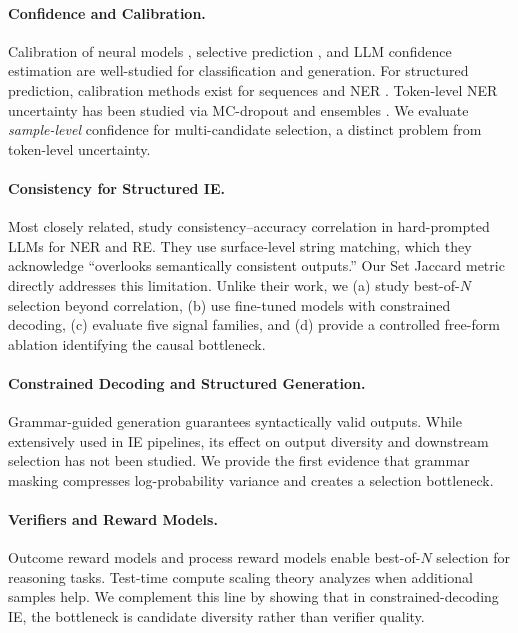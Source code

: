 \documentclass[11pt,a4paper]{article}
\begin{document}
\paragraph{Confidence and Calibration.}
Calibration of neural models \citep{guo2017calibration}, selective prediction \citep{geifman2017selective,abstentionsurvey2025}, and LLM confidence estimation \citep{confestsurvey2024} are well-studied for classification and generation. For structured prediction, calibration methods exist for sequences \citep{kuleshov2015calibration} and NER \citep{jagannatha2022calibrating}. Token-level NER uncertainty has been studied via MC-dropout \citep{gal2016dropout,xiao2019quantifying,shelmanov2021certain} and ensembles \citep{lakshminarayanan2017simple,he2020towards}. We evaluate \emph{sample-level} confidence for multi-candidate selection, a distinct problem from token-level uncertainty.

\paragraph{Consistency for Structured IE.}
Most closely related, \citet{nedellec2026consistency} study consistency--accuracy correlation in hard-prompted LLMs for NER and RE. They use surface-level string matching, which they acknowledge ``overlooks semantically consistent outputs.'' Our Set Jaccard metric directly addresses this limitation. Unlike their work, we (a) study best-of-$N$ selection beyond correlation, (b) use fine-tuned models with constrained decoding, (c) evaluate five signal families, and (d) provide a controlled free-form ablation identifying the causal bottleneck.

\paragraph{Constrained Decoding and Structured Generation.}
Grammar-guided generation \citep{willard2023efficient} guarantees syntactically valid outputs. While extensively used in IE pipelines, its effect on output diversity and downstream selection has not been studied. We provide the first evidence that grammar masking compresses log-probability variance and creates a selection bottleneck.

\paragraph{Verifiers and Reward Models.}
Outcome reward models \citep{cobbe2021training} and process reward models \citep{lightman2023lets} enable best-of-$N$ selection for reasoning tasks. Test-time compute scaling theory \citep{snell2024scaling,brown2024large} analyzes when additional samples help. We complement this line by showing that in constrained-decoding IE, the bottleneck is candidate diversity rather than verifier quality.
\end{document}
